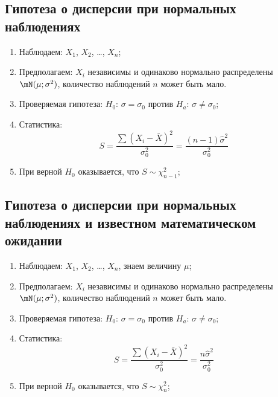 \documentclass[12pt, a4paper, oneside]{article}
\begin{document}
\subsection*{Гипотеза о дисперсии при нормальных наблюдениях}
    
\begin{enumerate}
    \item Наблюдаем: $X_1$, $X_2$, \ldots, $X_n$;
    
    \item Предполагаем: $X_i$ независимы и одинаково нормально распределены $\mN(\mu; \sigma^2)$, количество наблюдений $n$ может быть мало.
    
    \item Проверяемая гипотеза: $H_0$: $\sigma = \sigma_0$ против $H_a$: $\sigma \neq \sigma_0$;
    
    \item Статистика:
    \[
    S = \frac{\sum (X_i - \bar X)^2}{\sigma_0^2} = \frac{(n-1)\hat\sigma^2}{\sigma_0^2}
    \]
    
    \item При верной $H_0$ оказывается, что $S \sim \chi^2_{n-1}$;
\end{enumerate}

\subsection*{Гипотеза о дисперсии при нормальных наблюдениях и известном математическом ожидании}
    
\begin{enumerate}
    \item Наблюдаем: $X_1$, $X_2$, \ldots, $X_n$, знаем величину $\mu$;
    
    \item Предполагаем: $X_i$ независимы и одинаково нормально распределены $\mN(\mu; \sigma^2)$, количество наблюдений $n$ может быть мало.
    
    \item Проверяемая гипотеза: $H_0$: $\sigma = \sigma_0$ против $H_a$: $\sigma \neq \sigma_0$;
    
    \item Статистика:
    \[
    S = \frac{\sum (X_i - \bar X)^2}{\sigma_0^2} = \frac{n\hat\sigma^2}{\sigma_0^2}
    \]
    
    \item При верной $H_0$ оказывается, что $S \sim \chi^2_{n}$;
\end{enumerate}
\end{document}
